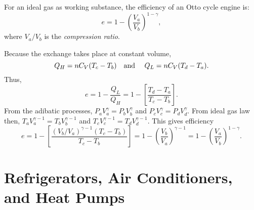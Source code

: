 \begin{remark}
    For an ideal gas as working substance, the efficiency of an Otto cycle engine is: $$e = 1 - (\frac{V_a}{V_b})^{1-\gamma},$$ where $V_a/V_b$ is the \emph{compression ratio}.
\end{remark}
\begin{explanation}
    Because the exchange takes place at constant volume, $$Q_H = nC_V(T_c-T_b) \text{\quad and \quad} Q_L = nC_V(T_d-T_a).$$
    Thus, $$e = 1- \frac{Q_L}{Q_H} = 1- \left[\frac{T_d-T_a}{T_c-T_b}\right].$$ From the adibatic processes, $P_aV_a^\gamma = P_bV_b^\gamma$ and $P_cV_c^\gamma = P_dV_d^\gamma.$ From ideal gas law then, $T_aV_a^{\gamma - 1} = T_bV_b^{\gamma - 1}$ and $T_cV_c^{\gamma - 1} = T_dV_d^{\gamma - 1}$. This gives efficiency $$e = 1 - \left[\frac{(V_b/V_a)^{\gamma - 1}(T_c-T_b)}{T_c-T_b}\right] = 1 - (\frac{V_b}{V_a})^{\gamma -1} = 1 - (\frac{V_a}{V_b})^{1-\gamma}.$$
\end{explanation}

\section{Refrigerators, Air Conditioners, and Heat Pumps}

